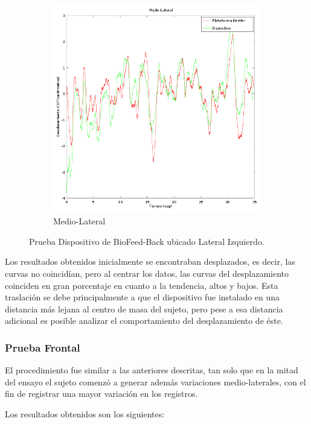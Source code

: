 \documentclass[12pt,a4paper]{article}
\newcommand{\nombreDispositivo}{Dispositivo de BioFeed-Back }
\begin{document}
\begin{figure}[H]
\begin{subfigure}{.5\textwidth}
			\includegraphics[width=1\linewidth]{images/pruebas/LateralIzquierdo/Medio-Lateral}
			\caption{Medio-Lateral}
			\label{fig:medioLateralIzquierdo}
		\end{subfigure}
		\caption{Prueba \nombreDispositivo ubicado Lateral Izquierdo.}
		\label{fig:pruebaLateralIzquierdo}
	\end{figure}
	
	Los resultados obtenidos inicialmente se encontraban desplazados, es decir, las curvas no coincidían, pero al centrar los datos, las curvas del desplazamiento coinciden en gran porcentaje en cuanto a la tendencia, altos y bajos.
	Esta traslación se debe principalmente a que el dispositivo fue instalado en una distancia más lejana al centro de masa del sujeto, pero pese a esa distancia adicional es posible analizar el comportamiento del desplazamiento de éste.
	
\newpage
\subsubsection{Prueba Frontal}
El procedimiento fue similar a las anteriores descritas, tan solo que en la mitad del ensayo el sujeto comenzó a generar además variaciones medio-laterales, con el fin de registrar una mayor variación en los registros.

Los resultados obtenidos son los siguientes:
	
\end{document}
